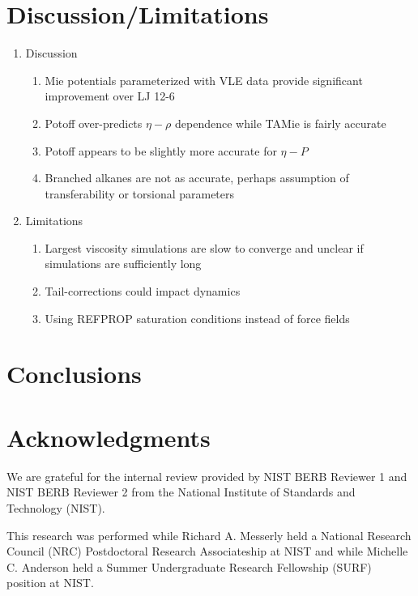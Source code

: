 \documentclass[preprint,review,12pt]{elsarticle}
\begin{document}
	\section{Discussion/Limitations}
	
	\begin{enumerate}
		\item Discussion
		\begin{enumerate}
			\item Mie potentials parameterized with VLE data provide significant improvement over LJ 12-6
			\item Potoff over-predicts $\eta-\rho$ dependence while TAMie is fairly accurate
			\item Potoff appears to be slightly more accurate for $\eta-P$
			\item Branched alkanes are not as accurate, perhaps assumption of transferability or torsional parameters
		\end{enumerate}
		\item Limitations
		\begin{enumerate}
			\item Largest viscosity simulations are slow to converge and unclear if simulations are sufficiently long
			\item Tail-corrections could impact dynamics
			\item Using REFPROP saturation conditions instead of force fields
		\end{enumerate}
	\end{enumerate}
	
	\section{Conclusions}
	
	\section*{Acknowledgments}
	
	We are grateful for the internal review provided by NIST BERB Reviewer 1 and NIST BERB Reviewer 2 from the National Institute of Standards and Technology (NIST). 
	
	This research was performed while Richard A. Messerly held a National Research Council (NRC) Postdoctoral Research Associateship at NIST and while Michelle C. Anderson held a Summer Undergraduate Research Fellowship (SURF) position at NIST.
	
	
	
\end{document}
